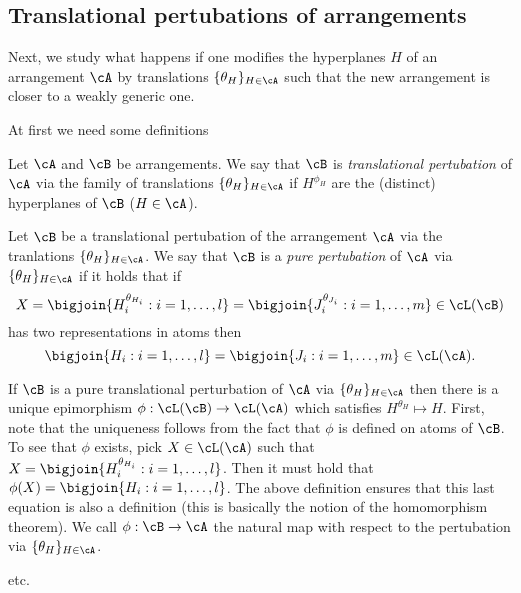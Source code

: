 
\subsection{Translational pertubations of arrangements}

Next, we study what happens if one modifies the hyperplanes $H$ of an arrangement $\cA$ by translations $\{\theta_H\}_{H\in\cA}$ such that the new arrangement is closer to a weakly generic one.

At first we need some definitions

\begin{definition}
    Let $\cA$ and $\cB$ be arrangements. We say that $\cB$ is
    \emph{translational pertubation} of $\cA$ via the family of translations $\{\theta_H\}_{H\in\cA}$ if $H^{\phi_H}$ are the (distinct) hyperplanes of $\cB$ ($H\in\cA$).
\end{definition}

\begin{definition}
    Let $\cB$ be a translational pertubation of the arrangement $\cA$ via the tranlations $\{\theta_H\}_{H\in\cA}$. We say that $\cB$ is a \emph{pure pertubation} of $\cA$ via $\{\theta_H\}_{H\in\cA}$ if it holds that if 
    $$
    X = \bigjoin\{H_i^{\theta_{H_i}}:i=1,\ldots,l\} = \bigjoin\{J_i^{\theta_{J_i}}:i=1,\ldots,m\}\in\cL(\cB)
  $$ has two representations in atoms then 
  $$
      \bigjoin\{H_i:i=1,\ldots,l\}=\bigjoin\{J_i:i=1,\ldots,m\}\in\cL(\cA)\text{.}
  $$
\end{definition}

\begin{remark}
    If $\cB$ is a pure translational perturbation of $\cA$ via $\{\theta_H\}_{H\in\cA}$ then there is a unique epimorphism $\phi:\cL(\cB)\to\cL(\cA)$ which satisfies $H^{\theta_H}\mapsto H$. First, note that the uniqueness follows from the fact that $\phi$ is defined on atoms of $\cB$. To see that $\phi$ exists,
    pick $X\in\cL(\cA)$ such that $X=\bigjoin\{H_i^{\theta_{H_i}}:i=1,\ldots,l\}$. Then it must hold that $\phi(X)=\bigjoin\{H_i:i=1,\ldots,l\}$. The above definition ensures that this last equation is also a definition (this is basically the notion of the homomorphism theorem).
    We call $\phi:\cB\to\cA$ the natural map with respect to the pertubation via $\{\theta_H\}_{H\in\cA}$. 
\end{remark}

\begin{definition}
    etc.
\end{definition}

